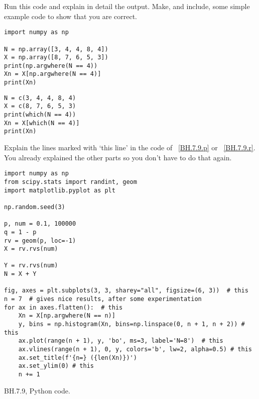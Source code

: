 \begin{exercise}
Run this code and explain in detail the output. Make, and include, some simple example code to show that you are correct.

\begin{verbatim}
import numpy as np

N = np.array([3, 4, 4, 8, 4])
X = np.array([8, 7, 6, 5, 3])
print(np.argwhere(N == 4))
Xn = X[np.argwhere(N == 4)]
print(Xn)
\end{verbatim}

\begin{verbatim}
N = c(3, 4, 4, 8, 4)
X = c(8, 7, 6, 5, 3)
print(which(N == 4))
Xn = X[which(N == 4)]
print(Xn)
\end{verbatim}
\end{exercise}

\begin{exercise}
Explain the lines marked with `this line' in the code of ~\cref{BH.7.9.p} or ~\cref{BH.7.9.r}. You already explained the other parts so you don't have to do that again.
\end{exercise}


\begin{listing}[!ht]
\begin{verbatim}
import numpy as np
from scipy.stats import randint, geom
import matplotlib.pyplot as plt

np.random.seed(3)

p, num = 0.1, 100000
q = 1 - p
rv = geom(p, loc=-1)
X = rv.rvs(num)

Y = rv.rvs(num)
N = X + Y

fig, axes = plt.subplots(3, 3, sharey="all", figsize=(6, 3))  # this
n = 7  # gives nice results, after some experimentation
for ax in axes.flatten():  # this
    Xn = X[np.argwhere(N == n)]
    y, bins = np.histogram(Xn, bins=np.linspace(0, n + 1, n + 2)) # this
    ax.plot(range(n + 1), y, 'bo', ms=3, label='N=8')  # this
    ax.vlines(range(n + 1), 0, y, colors='b', lw=2, alpha=0.5) # this
    ax.set_title(f'{n=} ({len(Xn)})')
    ax.set_ylim(0) # this
    n += 1
\end{verbatim}
\caption{BH.7.9, Python code.}
\label{BH.7.9.p}
\end{listing}


